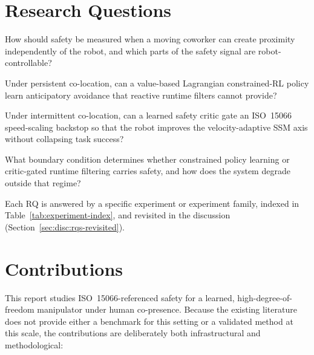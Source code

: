 \documentclass[11pt,a4paper]{report}
\newcommand{\ssm}{SSM}
\newcommand{\iso}{ISO~15066}
\begin{document}
\section{Research Questions}
\label{sec:intro:rqs}

\begin{description}[leftmargin=2em,style=nextline]
\item[RQ1] How should safety be measured when a moving coworker can
  create proximity independently of the robot, and which parts of the
  safety signal are robot-controllable?
\item[RQ2] Under persistent co-location, can a value-based
  Lagrangian constrained-RL policy learn anticipatory avoidance that
  reactive runtime filters cannot provide?
\item[RQ3] Under intermittent co-location, can a learned safety critic
  gate an \iso{} speed-scaling backstop so that the robot improves the
  velocity-adaptive \ssm{} axis without collapsing task success?
\item[RQ4] What boundary condition determines whether constrained
  policy learning or critic-gated runtime filtering carries safety,
  and how does the system degrade outside that regime?
\end{description}

Each RQ is answered by a specific experiment or experiment family,
indexed in Table~\ref{tab:experiment-index}, and revisited in the
discussion (Section~\ref{sec:disc:rqs-revisited}).

\section{Contributions}
\label{sec:intro:contributions}

This report studies \iso{}-referenced safety for a learned,
high-degree-of-freedom manipulator under human co-presence. Because the
existing literature does not provide either a benchmark for this
setting or a validated method at this scale, the contributions are
deliberately both infrastructural and methodological:
\end{document}
